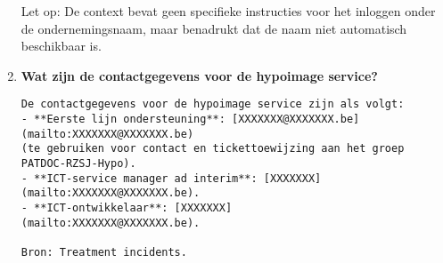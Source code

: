 \begin{enumerate}
    Let op: De context bevat geen specifieke instructies voor het inloggen onder de ondernemingsnaam, maar benadrukt dat de naam niet automatisch beschikbaar is.
    
    
    \item \textbf{Wat zijn de contactgegevens voor de hypoimage service?} \\
    \begin{verbatim}
De contactgegevens voor de hypoimage service zijn als volgt:  
- **Eerste lijn ondersteuning**: [XXXXXXX@XXXXXXX.be]
(mailto:XXXXXXX@XXXXXXX.be) 
(te gebruiken voor contact en tickettoewijzing aan het groep PATDOC-RZSJ-Hypo).  
- **ICT-service manager ad interim**: [XXXXXXX]
(mailto:XXXXXXX@XXXXXXX.be).  
- **ICT-ontwikkelaar**: [XXXXXXX]
(mailto:XXXXXXX@XXXXXXX.be).  

Bron: Treatment incidents.
    \end{verbatim}
\end{enumerate}

